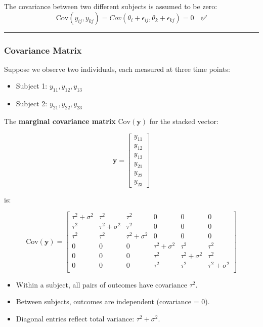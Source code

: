 \documentclass[
  letterpaper,
  DIV=11,
  numbers=noendperiod]{scrreprt}
\providecommand{\tightlist}{%
  \setlength{\itemsep}{0pt}\setlength{\parskip}{0pt}}\usepackage{longtable,booktabs,array}
\begin{document}
The covariance between two different subjects is assumed to be zero: \[
\text{Cov}(y_{ij}, y_{kj}) = Cov(\theta_i + \epsilon_{ij}, \theta_k + \epsilon_{kj}) = 0 \quad ✅ 
\]

\begin{center}\rule{0.5\linewidth}{0.5pt}\end{center}

\hypertarget{covariance-matrix}{%
\subsubsection*{Covariance Matrix}\label{covariance-matrix}}

Suppose we observe two individuals, each measured at three time points:

\begin{itemize}
\tightlist
\item
  Subject 1: \(y_{11}, y_{12}, y_{13}\)
\item
  Subject 2: \(y_{21}, y_{22}, y_{23}\)
\end{itemize}

The \textbf{marginal covariance matrix} \(\text{Cov}(\mathbf{y})\) for
the stacked vector:

\[
\mathbf{y} = 
\begin{bmatrix}
y_{11} \\
y_{12} \\
y_{13} \\
y_{21} \\
y_{22} \\
y_{23}
\end{bmatrix}
\]

is:

\[
\text{Cov}(\mathbf{y}) =
\begin{bmatrix}
\tau^2 + \sigma^2 & \tau^2 & \tau^2 & 0 & 0 & 0 \\
\tau^2 & \tau^2 + \sigma^2 & \tau^2 & 0 & 0 & 0 \\
\tau^2 & \tau^2 & \tau^2 + \sigma^2 & 0 & 0 & 0 \\
0 & 0 & 0 & \tau^2 + \sigma^2 & \tau^2 & \tau^2 \\
0 & 0 & 0 & \tau^2 & \tau^2 + \sigma^2 & \tau^2 \\
0 & 0 & 0 & \tau^2 & \tau^2 & \tau^2 + \sigma^2 \\
\end{bmatrix}
\]

\begin{itemize}
\tightlist
\item
  Within a subject, all pairs of outcomes have covariance \(\tau^2\).
\item
  Between subjects, outcomes are independent (covariance = 0).
\item
  Diagonal entries reflect total variance: \(\tau^2 + \sigma^2\).
\end{itemize}
\end{document}
